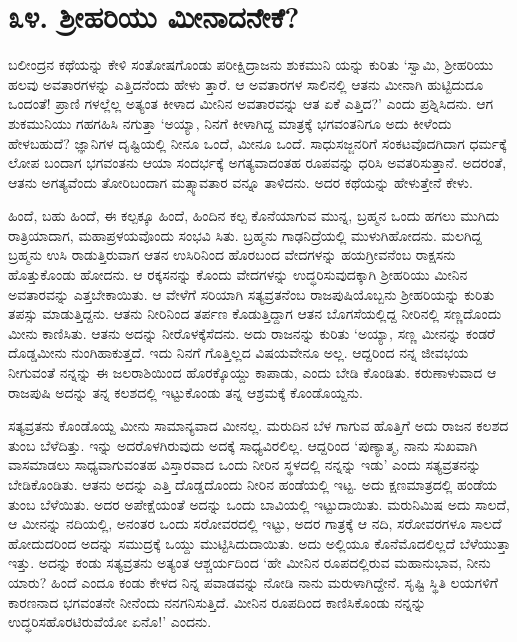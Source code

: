 
\chapter{೩೪. ಶ್ರೀಹರಿಯು ಮೀನಾದನೇಕೆ?}

ಬಲೀಂದ್ರನ ಕಥೆಯನ್ನು ಕೇಳಿ ಸಂತೋಷಗೊಂಡು ಪರೀಕ್ಷಿದ್ರಾಜನು ಶುಕಮುನಿ ಯನ್ನು ಕುರಿತು ‘ಸ್ವಾಮಿ, ಶ್ರೀಹರಿಯು ಹಲವು ಅವತಾರಗಳನ್ನು ಎತ್ತಿದನೆಂದು ಹೇಳು ತ್ತಾರೆ. ಆ ಅವತಾರಗಳ ಸಾಲಿನಲ್ಲಿ ಆತನು ಮೀನಾಗಿ ಹುಟ್ಟಿದುದೂ ಒಂದಂತೆ! ಪ್ರಾಣಿ ಗಳಲ್ಲೆಲ್ಲ ಅತ್ಯಂತ ಕೀಳಾದ ಮೀನಿನ ಅವತಾರವನ್ನು ಆತ ಏಕೆ ಎತ್ತಿದ?’ ಎಂದು ಪ್ರಶ್ನಿಸಿದನು. ಆಗ ಶುಕಮುನಿಯು ಗಹಗಹಿಸಿ ನಗುತ್ತಾ ‘ಅಯ್ಯಾ, ನಿನಗೆ ಕೀಳಾಗಿದ್ದ ಮಾತ್ರಕ್ಕೆ ಭಗವಂತನಿಗೂ ಅದು ಕೀಳೆಂದು ಹೇಳಬಹುದೆ? ಜ್ಞಾನಿಗಳ ದೃಷ್ಟಿಯಲ್ಲಿ ನೀನೂ ಒಂದೆ, ಮೀನೂ ಒಂದೆ. ಸಾಧುಸಜ್ಜನರಿಗೆ ಸಂಕಟವೊದಗಿದಾಗ ಧರ್ಮಕ್ಕೆ ಲೋಪ ಬಂದಾಗ ಭಗವಂತನು ಆಯಾ ಸಂದರ್ಭಕ್ಕೆ ಅಗತ್ಯವಾದಂತಹ ರೂಪವನ್ನು ಧರಿಸಿ ಅವತರಿಸುತ್ತಾನೆ. ಅದರಂತೆ, ಆತನು ಅಗತ್ಯವೆಂದು ತೋರಿಬಂದಾಗ ಮತ್ಸ್ಯಾವತಾರ ವನ್ನೂ ತಾಳಿದನು. ಅದರ ಕಥೆಯನ್ನು ಹೇಳುತ್ತೇನೆ ಕೇಳು. 

ಹಿಂದೆ, ಬಹು ಹಿಂದೆ, ಈ ಕಲ್ಪಕ್ಕೂ ಹಿಂದೆ, ಹಿಂದಿನ ಕಲ್ಪ ಕೊನೆಯಾಗುವ ಮುನ್ನ, ಬ್ರಹ್ಮನ ಒಂದು ಹಗಲು ಮುಗಿದು ರಾತ್ರಿಯಾದಾಗ, ಮಹಾಪ್ರಳಯವೊಂದು ಸಂಭವಿ ಸಿತು. ಬ್ರಹ್ಮನು ಗಾಢನಿದ್ರೆಯಲ್ಲಿ ಮುಳುಗಿಹೋದನು. ಮಲಗಿದ್ದ ಬ್ರಹ್ಮನು ಉಸಿ ರಾಡುತ್ತಿರುವಾಗ ಆತನ ಉಸಿರಿನಿಂದ ಹೊರಬಂದ ವೇದಗಳನ್ನು ಹಯಗ್ರೀವನೆಂಬ ರಾಕ್ಷಸನು ಹೊತ್ತುಕೊಂಡು ಹೋದನು. ಆ ರಕ್ಕಸನನ್ನು ಕೊಂದು ವೇದಗಳನ್ನು ಉದ್ಧರಿಸುವುದಕ್ಕಾಗಿ ಶ್ರೀಹರಿಯು ಮೀನಿನ ಅವತಾರವನ್ನು ಎತ್ತಬೇಕಾಯಿತು. ಆ ವೇಳೆಗೆ ಸರಿಯಾಗಿ ಸತ್ಯವ್ರತನೆಂಬ ರಾಜಪುಷಿಯೊಬ್ಬನು ಶ್ರೀಹರಿಯನ್ನು ಕುರಿತು ತಪಸ್ಸು ಮಾಡುತ್ತಿದ್ದನು. ಆತನು ನೀರಿನಿಂದ ತರ್ಪಣ ಕೊಡುತ್ತಿದ್ದಾಗ ಆತನ ಬೊಗಸೆಯಲ್ಲಿದ್ದ ನೀರಿನಲ್ಲಿ ಸಣ್ಣದೊಂದು ಮೀನು ಕಾಣಿಸಿತು. ಆತನು ಅದನ್ನು ನೀರೊಳಕ್ಕೆಸೆದನು. ಅದು ರಾಜನನ್ನು ಕುರಿತು ‘ಅಯ್ಯಾ, ಸಣ್ಣ ಮೀನನ್ನು ಕಂಡರೆ ದೊಡ್ಡಮೀನು ನುಂಗಿಹಾಕುತ್ತದೆ. ಇದು ನಿನಗೆ ಗೊತ್ತಿಲ್ಲದ ವಿಷಯವೇನೂ ಅಲ್ಲ. ಆದ್ದರಿಂದ ನನ್ನ ಜೀವಭಯ ನೀಗುವಂತೆ ನನ್ನನ್ನು ಈ ಜಲರಾಶಿಯಿಂದ ಹೊರಕ್ಕೊಯ್ದು ಕಾಪಾಡು, ಎಂದು ಬೇಡಿ ಕೊಂಡಿತು. ಕರುಣಾಳುವಾದ ಆ ರಾಜಪುಷಿ ಅದನ್ನು ತನ್ನ ಕಲಶದಲ್ಲಿ ಇಟ್ಟುಕೊಂಡು ತನ್ನ ಆಶ್ರಮಕ್ಕೆ ಕೊಂಡೊಯ್ದನು.

ಸತ್ಯವ್ರತನು ಕೊಂಡೊಯ್ದ ಮೀನು ಸಾಮಾನ್ಯವಾದ ಮೀನಲ್ಲ. ಮರುದಿನ ಬೆಳ ಗಾಗುವ ಹೊತ್ತಿಗೆ ಅದು ರಾಜನ ಕಲಶದ ತುಂಬ ಬೆಳೆದಿತ್ತು. ಇನ್ನು ಅದರೊಳಗಿರುವುದು ಅದಕ್ಕೆ ಸಾಧ್ಯವಿರಲಿಲ್ಲ. ಆದ್ದರಿಂದ ‘ಪುಣ್ಯಾತ್ಮ, ನಾನು ಸುಖವಾಗಿ ವಾಸಮಾಡಲು ಸಾಧ್ಯವಾಗುವಂತಹ ವಿಸ್ತಾರವಾದ ಒಂದು ನೀರಿನ ಸ್ಥಳದಲ್ಲಿ ನನ್ನನ್ನು ಇಡು’ ಎಂದು ಸತ್ಯವ್ರತನನ್ನು ಬೇಡಿಕೊಂಡಿತು. ಆತನು ಅದನ್ನು ಎತ್ತಿ ದೊಡ್ಡದೊಂದು ನೀರಿನ ಹಂಡೆಯಲ್ಲಿ ಇಟ್ಟ. ಅದು ಕ್ಷಣಮಾತ್ರದಲ್ಲಿ ಹಂಡೆಯ ತುಂಬ ಬೆಳೆಯಿತು. ಅದರ ಅಪೇಕ್ಷೆಯಂತೆ ಅದನ್ನು ಒಂದು ಬಾವಿಯಲ್ಲಿ ಇಟ್ಟುದಾಯಿತು. ಮರುನಿಮಿಷ ಅದು ಸಾಲದೆ, ಆ ಮೀನನ್ನು ನದಿಯಲ್ಲಿ, ಅನಂತರ ಒಂದು ಸರೋವರದಲ್ಲಿ ಇಟ್ಟು, ಅದರ ಗಾತ್ರಕ್ಕೆ ಆ ನದಿ, ಸರೋವರಗಳೂ ಸಾಲದೆ ಹೋದುದರಿಂದ ಅದನ್ನು ಸಮುದ್ರಕ್ಕೆ ಒಯ್ದು ಮುಟ್ಟಿಸಿದುದಾಯಿತು. ಅದು ಅಲ್ಲಿಯೂ ಕೊನೆಮೊದಲಿಲ್ಲದೆ ಬೆಳೆಯುತ್ತಾ ಇತ್ತು. ಅದನ್ನು ಕಂಡು ಸತ್ಯವ್ರತನು ಅತ್ಯಂತ ಆಶ್ಚರ್ಯದಿಂದ ‘ಹೇ ಮೀನಿನ ರೂಪದಲ್ಲಿರುವ ಮಹಾನುಭಾವ, ನೀನು ಯಾರು? ಹಿಂದೆ ಎಂದೂ ಕಂಡು ಕೇಳದ ನಿನ್ನ ಪವಾಡವನ್ನು ನೋಡಿ ನಾನು ಮರುಳಾಗಿದ್ದೇನೆ. ಸೃಷ್ಟಿ ಸ್ಥಿತಿ ಲಯಗಳಿಗೆ ಕಾರಣನಾದ ಭಗವಂತನೇ ನೀನೆಂದು ನನಗನಿಸುತ್ತಿದೆ. ಮೀನಿನ ರೂಪದಿಂದ ಕಾಣಿಸಿಕೊಂಡು ನನ್ನನ್ನು ಉದ್ಧರಿಸಹೊರಟಿರುವೆಯೋ ಏನೊ!’ ಎಂದನು.

